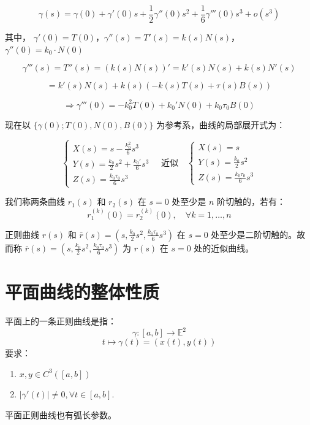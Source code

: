\documentclass[lang=cn,10pt,thmcnt=section]{elegantbook}
\begin{document}
$$
\gamma(s) = \gamma(0) + \gamma'(0)s + \frac{1}{2}\gamma''(0)s^2 + \frac{1}{6}\gamma'''(0)s^3 + o(s^3)
$$

其中，
\(\gamma'(0) = T(0)\)，\(\gamma''(s) = T'(s) = k(s)N(s)\)，\(\gamma''(0) = k_0 \cdot N(0)\)

$$
\gamma'''(s) = T''(s) = \left( k(s)N(s) \right)' = k'(s)N(s) + k(s)N'(s)
$$

$$
= k'(s)N(s) + k(s)\left( -k(s)T(s) + \tau(s)B(s) \right)
$$

$$
\Rightarrow \gamma'''(0) = -k_0^2 T(0) + k_0' N(0) + k_0 \tau_0 B(0)
$$

现在以 \(\{ \gamma(0); T(0), N(0), B(0) \}\) 为参考系，曲线的局部展开式为：

$$
\begin{cases}
X(s) = s - \frac{k_0^2}{6} s^3 \\
Y(s) = \frac{k_0}{2} s^2 + \frac{k_0'}{6} s^3 \\
Z(s) = \frac{k_0 \tau_0}{6} s^3
\end{cases}
\quad \text{近似} \quad
\begin{cases}
X(s) = s \\
Y(s) = \frac{k_0}{2} s^2 \\
Z(s) = \frac{k_0 \tau_0}{6} s^3
\end{cases}
$$
\begin{definition}
    我们称两条曲线 \(r_1(s)\) 和 \(r_2(s)\) 在 \(s=0\) 处至少是 \(n\) 阶切触的，若有：
$$
r_1^{(k)}(0) = r_2^{(k)}(0), \quad \forall k=1,\ldots,n
$$
\end{definition}
\begin{corollary}
    正则曲线 \(r(s)\) 和 \(\bar{r}(s) = \left( s, \frac{k_0}{2} s^2, \frac{k_0 \tau_0}{6} s^3 \right)\) 在 \(s=0\) 处至少是二阶切触的。故而称 \(\bar{r}(s) = \left( s, \frac{k_0}{2} s^2, \frac{k_0 \tau_0}{6} s^3 \right)\) 为 \(r(s)\) 在 \(s=0\) 处的近似曲线。
\end{corollary}

\section{平面曲线的整体性质}

\begin{definition}\label{def:curve}
    平面上的一条正则曲线是指：
    \[
    \gamma : [a, b] \rightarrow \mathbb{E}^2
    \]
    \[
    t \mapsto \gamma(t) = (x(t), y(t))
    \]
    要求：
    \begin{enumerate}
        \item $x, y \in C^3([a, b])$
        \item $|\gamma'(t)| \neq 0, \forall t \in [a, b]$.
    \end{enumerate}
    \begin{remark}
        平面正则曲线也有弧长参数。
    \end{remark}
    \end{definition}
    
\end{document}
